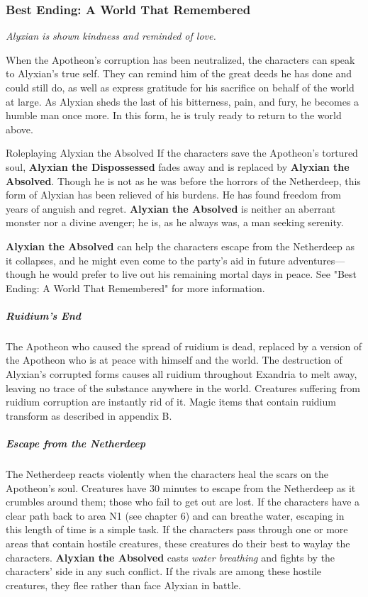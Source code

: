 \documentclass[10pt,a4paper,twoside,bg=print,twocolumn,openany,nodeprecatedcode]{dndbook}
\begin{document}
\subsubsection{Best Ending: A World That Remembered}
\textit{Alyxian is shown kindness and reminded of love.}

When the Apotheon's corruption has been neutralized, the characters can speak to Alyxian's true self. They can remind him of the great deeds he has done and could still do, as well as express gratitude for his sacrifice on behalf of the world at large. As Alyxian sheds the last of his bitterness, pain, and fury, he becomes a humble man once more. In this form, he is truly ready to return to the world above.

\begin{DndSidebar}[float=!b]{Roleplaying Alyxian the Absolved}
If the characters save the Apotheon's tortured soul, \textbf{Alyxian the Dispossessed} fades away and is replaced by \textbf{Alyxian the Absolved}. Though he is not as he was before the horrors of the Netherdeep, this form of Alyxian has been relieved of his burdens. He has found freedom from years of anguish and regret. \textbf{Alyxian the Absolved} is neither an aberrant monster nor a divine avenger; he is, as he always was, a man seeking serenity.



\textbf{Alyxian the Absolved} can help the characters escape from the Netherdeep as it collapses, and he might even come to the party's aid in future adventures—though he would prefer to live out his remaining mortal days in peace. See "Best Ending: A World That Remembered" for more information.



\end{DndSidebar}

\subparagraph{Ruidium's End}
The Apotheon who caused the spread of ruidium is dead, replaced by a version of the Apotheon who is at peace with himself and the world. The destruction of Alyxian's corrupted forms causes all ruidium throughout Exandria to melt away, leaving no trace of the substance anywhere in the world. Creatures suffering from ruidium corruption are instantly rid of it. Magic items that contain ruidium transform as described in appendix B.

\subparagraph{Escape from the Netherdeep}
The Netherdeep reacts violently when the characters heal the scars on the Apotheon's soul. Creatures have 30 minutes to escape from the Netherdeep as it crumbles around them; those who fail to get out are lost. If the characters have a clear path back to area N1 (see chapter 6) and can breathe water, escaping in this length of time is a simple task. If the characters pass through one or more areas that contain hostile creatures, these creatures do their best to waylay the characters. \textbf{Alyxian the Absolved} casts \textit{water breathing} and fights by the characters' side in any such conflict. If the rivals are among these hostile creatures, they flee rather than face Alyxian in battle.
\end{document}
